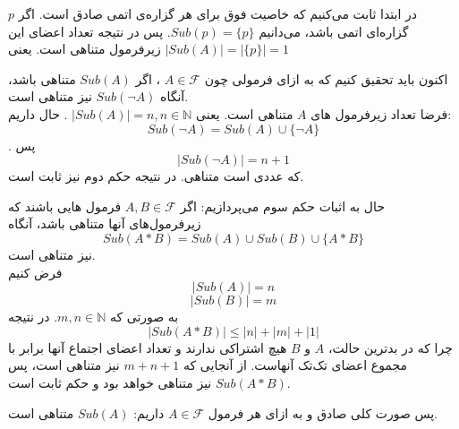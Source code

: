\documentclass[]{exam}
\begin{document}
در ابتدا ثابت می‌کنیم که خاصیت فوق برای هر گزاره‌ی اتمی صادق است.
اگر
$p$
گزاره‌ای اتمی باشد، می‌دانیم
$Sub(p) = \{p\}$.
پس در نتیجه تعداد اعضای این زیرفرمول متناهی است. یعنی
$|Sub(A)| = |\{p\}| = 1$

اکنون باید تحقیق کنیم که به ازای فرمولی چون
$A \in \mathscr{F}$
،
اگر
$Sub(A)$
متناهی باشد، آنگاه
$Sub(\neg A)$
نیز متناهی است.
\\
فرضا تعداد زیرفرمول های
$A$
متناهی است. یعنی
$|Sub(A)| = n, n \in \mathbb{N}$
.
حال داریم:
$$Sub(\neg A) = Sub(A) \cup \{\neg A\}$$
.
پس
$$|Sub(\neg A)| = n + 1$$
که عددی است متناهی.
در نتیجه حکم دوم نیز ثابت است.

حال به اثبات حکم سوم می‌پردازیم:
اگر 
$A, B \in \mathscr{F}$
فرمول هایی باشند که زیرفرمول‌های آنها متناهی باشد،
آنگاه
$$Sub(A * B) = Sub(A) \cup Sub(B) \cup \{A * B\}$$
نیز متناهی است.
\\
فرض کنیم
$$|Sub(A)| = n$$
$$|Sub(B)| = m$$
به صورتی که 
$m,n \in \mathbb{N}$.
در نتیجه 
$$|Sub(A * B)| \le |n| + |m| + |1|$$
چرا که در بدترین حالت،
$A$
و
$B$
هیچ اشتراکی ندارند و تعداد اعضای اجتماع آنها برابر با مجموع اعضای تک‌تک آنهاست. از آنجایی که 
$m + n + 1$
نیز متناهی است، پس
$Sub(A * B)$
نیز متناهی خواهد بود و حکم ثابت است.

پس صورت کلی صادق و به ازای هر فرمول
$A \in \mathscr{F}$
داریم: 
$Sub(A)$
متناهی است.
\end{document}
